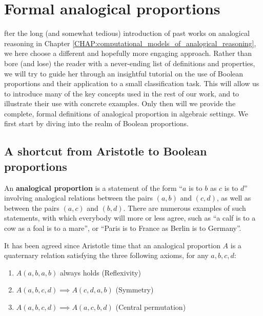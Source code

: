 \chapter{Formal analogical proportions}
\label{CHAP:formal_analogical_proportions}

fter the long (and somewhat tedious) introduction of past works on
analogical reasoning in Chapter
\ref{CHAP:computational_models_of_analogical_reasoning}, we here choose a
different and hopefully more engaging approach. Rather than bore (and lose) the
reader with a never-ending list of definitions and properties, we will try to
guide her through an insightful tutorial on the use of Boolean proportions and
their application to a small classification task. This will allow us to
introduce many of the key concepts used in the rest of our work, and to
illustrate their use with concrete examples. Only then will we provide the
complete, formal definitions of analogical proportion in algebraic settings. We
first start by diving into the realm of Boolean proportions.

\section{A shortcut from Aristotle to Boolean proportions}
\label{SEC:shortcut_from_aristotle_to_boolean_proportions}

An \textbf{analogical proportion} is a statement of the form ``$a$ is to $b$ as
$c$ is to $d$'' involving analogical relations between the pairs $(a,b)$ and
$(c,d)$, as well as between the pairs $(a,c)$ and $(b,d)$.  There are numerous
examples of such statements, with which everybody will more or less agree, such
as  ``a calf is to a cow as a foal is to a mare'', or ``Paris is to France as
Berlin is to Germany''.

It has been agreed since Aristotle time that an analogical proportion $A$ is a
quaternary relation satisfying the three following axioms, for any $a, b, c, d$:

\begin{enumerate}
\item $A(a,b,a,b)$ always holds (Reflexivity)
\item $A(a,b,c,d) \implies A(c,d,a,b)$ (Symmetry)
\item $A(a,b,c,d) \implies A(a,c,b,d)$ (Central permutation)
\end{enumerate}

